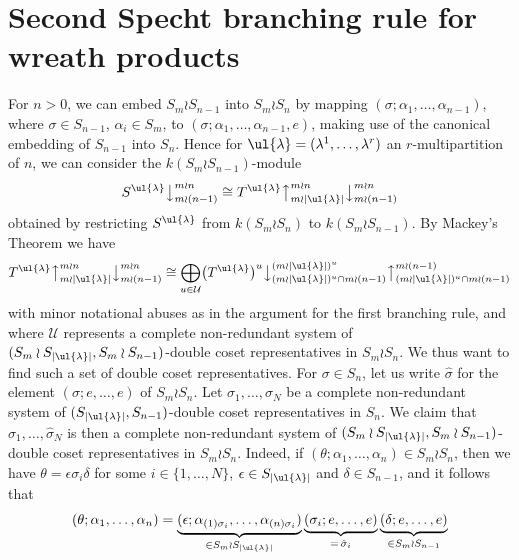 \section{Second Specht branching rule for wreath products}
For $n>0$, we can embed $S_m \wr S_{n-1}$ into $S_m \wr S_n$ by mapping $(\sigma;\alpha_1,\ldots,\alpha_{n-1})$, where
$\sigma \in S_{n-1}$, $\alpha_i \in S_m$, to $ (\sigma;\alpha_1,\ldots,\alpha_{n-1},e)$, making use of the canonical embedding of
$S_{n-1}$ into $S_n$.
Hence for $\ul{\lambda} = (\lambda^1,\ldots,\lambda^r)$ an $r$-multipartition of $n$, we can consider the $k(S_m \wr S_{n-1})$-module
\[ S^{\ul{\lambda}}\bigr\downarrow^{m \wr n}_{m \wr (n-1)} \cong
T^{\ul{\lambda}}\bigr\uparrow^{m{\wr}n}_{m{\wr}|\ul{\lambda}|}\bigr\downarrow^{m \wr n}_{m \wr (n-1)}\]
obtained by restricting $S^{\ul{\lambda}}$ from $k(S_m \wr S_n)$ to $k(S_m \wr S_{n-1})$. By Mackey's Theorem we have
\begin{equation}\label{res_Sp_mwrnsub_mackey:eq}
T^{\ul{\lambda}}\bigr\uparrow^{m{\wr}n}_{m{\wr}|\ul{\lambda}|}\bigr\downarrow^{m \wr n}_{m \wr (n-1)}
\cong
\bigoplus_{u \in \mathcal{U}}\bigl(T^{\ul{\lambda}}\bigr)^u\bigl\downarrow^{(m{\wr}|\ul{\lambda}|)^u}_{(m{\wr}|\ul{\lambda}|)^u \cap m \wr (n-1)}
\bigl\uparrow^{m \wr (n-1)}_{(m{\wr}|\ul{\lambda}|)^u \cap m \wr (n-1)}
\end{equation}
with minor notational abuses as in the argument for the first branching rule, and where $\mathcal{U}$ represents a complete non-redundant
system of $(S_m \wr S_{|\ul{\lambda}|},S_m \wr S_{n-1})$-double coset representatives in $S_m \wr S_n$. We thus want to find such a set of
double coset representatives. For  $\sigma \in S_n$, let us write $\hat\sigma$ for the element $(\sigma;e,\ldots,e)$ of $S_m \wr S_n$.
Let $\sigma_1,\ldots,\sigma_N$ be a complete non-redundant system of $(S_{|\ul{\lambda}|},S_{n-1})$-double coset representatives in $S_n$. We
claim that $\hat\sigma_1,\ldots,\hat\sigma_N$ is then a complete non-redundant system of $(S_m \wr S_{|\ul{\lambda}|},S_m \wr S_{n-1})$-double
coset representatives in $S_m \wr S_n$. Indeed, if $(\theta;\alpha_1,\ldots,\alpha_n) \in S_m \wr S_n$, then we have
$\theta = \epsilon \sigma_i \delta$
for some $i \in \{1,\ldots,N\}$, $\epsilon \in S_{|\ul{\lambda}|}$ and $\delta \in S_{n-1}$, and it follows that
\[
(\theta;\alpha_1,\ldots,\alpha_n) =
\underbrace{(\epsilon;\alpha_{(1)\sigma_i},\ldots,\alpha_{(n)\sigma_i})}_{\in S_m \wr S_{|\ul{\lambda}|}}
\underbrace{(\sigma_i;e,\ldots,e)}_{=\,\hat\sigma_i}
\underbrace{(\delta;e,\ldots,e)}_{\in S_m \wr S_{n-1}}
\]

